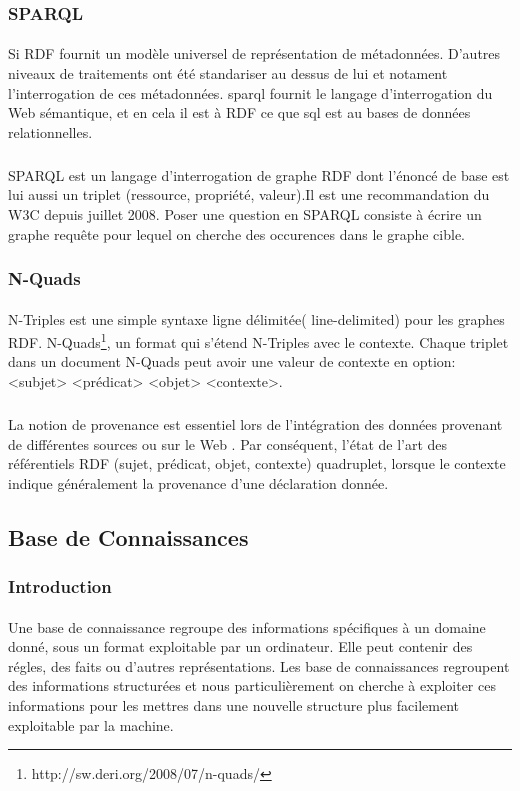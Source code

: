 \documentclass[12pt,a4	]{report}
\begin{document}
\subsubsection*{SPARQL}
\paragraph{}
Si RDF fournit un modèle universel de représentation de métadonnées. D'autres niveaux de traitements ont été standariser au dessus de lui  et notament l'interrogation de ces métadonnées.
\gls{sparql} fournit le langage d'interrogation du Web sémantique, et en cela il est à RDF ce que \gls{sql} est au bases de données relationnelles.
\subparagraph{}
SPARQL est un langage d'interrogation de graphe RDF dont l'énoncé de base est lui aussi un triplet (ressource, propriété, valeur).Il est une recommandation du W3C depuis juillet 2008.
Poser une question en SPARQL consiste à écrire un graphe requête pour lequel on cherche des occurences dans le graphe cible.
\subsubsection*{N-Quads}
\paragraph{}
N-Triples est une simple syntaxe ligne délimitée( line-delimited) pour les graphes RDF. N-Quads\footnote{http://sw.deri.org/2008/07/n-quads/}, un format qui s'étend N-Triples avec le contexte. Chaque triplet dans un document N-Quads peut avoir une valeur de contexte en option: 
\newline
<subjet> <prédicat> <objet> <contexte>.
\subparagraph{}
La notion de provenance est essentiel lors de l'intégration des données provenant de différentes sources ou sur le Web . Par conséquent, l'état de l'art des référentiels RDF (sujet, prédicat, objet, contexte) quadruplet, lorsque le contexte indique généralement la provenance d'une déclaration donnée.
\newpage
\subsection*{Base de Connaissances}
\subsubsection*{Introduction}
\paragraph{}
Une base de connaissance regroupe des informations spécifiques à un domaine donné, sous un format exploitable par un ordinateur. Elle peut contenir des régles, des faits ou d'autres représentations. Les base de connaissances regroupent des informations structurées et nous particulièrement on cherche à exploiter ces informations pour les mettres dans une nouvelle structure plus facilement exploitable par la machine.
\end{document}
